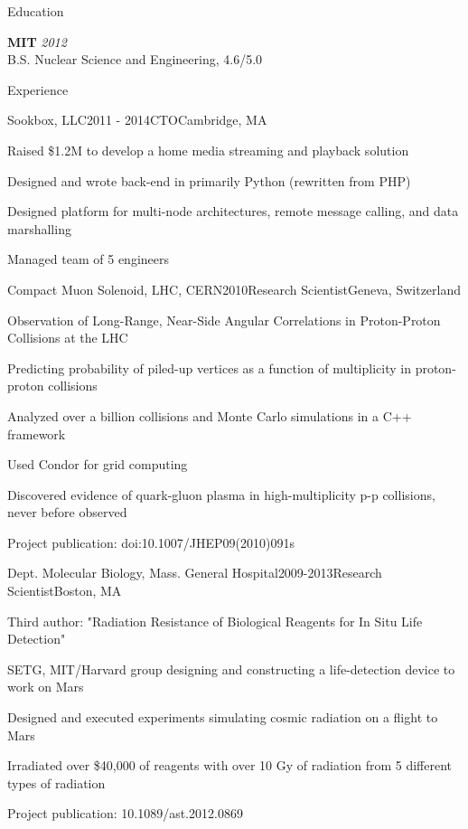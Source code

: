 \documentclass{resume}
\begin{document}

\begin{rSection}{Education}

{\bf MIT} \hfill {\em 2012} \\ 
B.S. Nuclear Science and Engineering, 4.6/5.0

\end{rSection}


\begin{rSection}{Experience}

\begin{rSubsection}{Sookbox, LLC}{2011 - 2014}{CTO}{Cambridge, MA}
\item Raised \$1.2M to develop a home media streaming and playback solution
\item Designed and wrote back-end in primarily Python (rewritten from PHP)
\item Designed platform for multi-node architectures, remote message calling, and data marshalling
\item Managed team of 5 engineers
\end{rSubsection}

\begin{rSubsection}{Compact Muon Solenoid, LHC, CERN}{2010}{Research Scientist}{Geneva, Switzerland}
\item Observation of Long-Range, Near-Side Angular Correlations in Proton-Proton Collisions at the LHC
\item Predicting probability of piled-up vertices as a function of multiplicity in proton-proton collisions
\item Analyzed over a billion collisions and Monte Carlo simulations in a C++ framework
\item Used Condor for grid computing
\item Discovered evidence of quark-gluon plasma in high-multiplicity p-p collisions, never before observed
\item Project publication: doi:10.1007/JHEP09(2010)091s
\end{rSubsection}


\begin{rSubsection}{Dept. Molecular Biology, Mass. General Hospital}{2009-2013}{Research Scientist}{Boston, MA}
\item Third author: "Radiation Resistance of Biological Reagents for In Situ Life Detection"
\item SETG, MIT/Harvard group designing and constructing a life-detection device to work on Mars
\item Designed and executed experiments simulating cosmic radiation on a flight to Mars
\item Irradiated over \$40,000 of reagents with over 10 Gy of radiation from 5 different types of radiation
\item Project publication: 10.1089/ast.2012.0869
\end{rSubsection}



\end{rSection}
\end{document}
